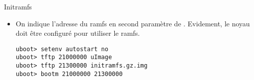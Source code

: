 \begin{frame}[fragile=singleslide]{Initramfs}
  \begin{itemize}
  \item  On  indique  l'adresse   du  ramfs  en  second  paramètre  de
    . Evidement, le noyau doit être configuré pour utiliser
    le ramfs.
    \begin{lstlisting}
uboot> setenv autostart no
uboot> tftp 21000000 uImage
uboot> tftp 21300000 initramfs.gz.img
uboot> bootm 21000000 21300000
    \end{lstlisting}
  \end{itemize}
\end{frame}
